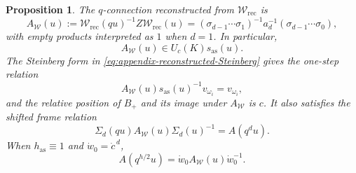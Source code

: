\documentclass[11pt,leqno]{amsart}
\numberwithin{equation}{section}
\theoremstyle{plain}
\newtheorem{proposition}[theorem]{Proposition}
\theoremstyle{definition}
\theoremstyle{plain}
\theoremstyle{definition}
\theoremstyle{remark}
\begin{document}
\begin{proposition}\label{prop:Wronskian-transport-telescoping}\label{cor:BW-shifted-Steinberg}
The $q$-connection reconstructed from $\mathscr W_{\mathrm{rec}}$ is
\begin{equation}\label{eq:Wronskian-transport-telescoped}
 A_{\mathscr W}(u)
 :=\mathscr W_{\mathrm{rec}}(qu)^{-1}Z\mathscr W_{\mathrm{rec}}(u)
 =\left(\sigma_{d-1}\cdots \sigma_1\right)^{-1}
  a_d^{-1}
  \left(\sigma_{d-1}\cdots \sigma_0\right),
\end{equation}
with empty products interpreted as $1$ when $d=1$.  In particular,
\begin{equation}\label{eq:appendix-reconstructed-Steinberg}
 A_{\mathscr W}(u)\in U_c(K)s_{\mathrm{as}}(u).
\end{equation}
The Steinberg form in \eqref{eq:appendix-reconstructed-Steinberg} gives the one-step relation
\begin{equation}\label{eq:BW-oper-line}
 A_{\mathscr W}(u)s_{\mathrm{as}}(u)^{-1}v_{\omega_i}=v_{\omega_i},
\end{equation}
and the relative position of $B_+$ and its image under $A_{\mathscr W}$ is $c$.
It also satisfies the shifted frame relation
\begin{equation}\label{eq:BW-shifted-Steinberg-frame}
 \Sigma_d(qu)A_{\mathscr W}(u)\Sigma_d(u)^{-1}
 =A(q^du).
\end{equation}
When $h_{\mathrm{as}}\equiv1$ and $\dot w_0=\dot c^{\,d}$,
\begin{equation}\label{eq:BW-shifted-Steinberg-standard}
 A(q^{h/2}u)=\dot w_0A_{\mathscr W}(u)\dot w_0^{-1}.
\end{equation}
\end{proposition}
\end{document}
